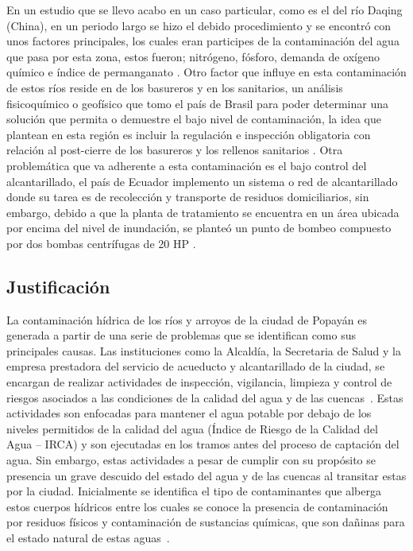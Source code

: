 En un estudio que se llevo acabo en un caso particular, como es el del río Daqing (China), en un periodo largo se hizo el debido procedimiento y se encontró con unos factores principales, los cuales eran participes de la contaminación del agua que pasa por esta zona, estos fueron; nitrógeno, fósforo, demanda de oxígeno químico e índice de permanganato \cite{He2021}. Otro factor que influye en esta contaminación de estos ríos reside en de los basureros y en los sanitarios, un análisis fisicoquímico o geofísico que tomo el país de Brasil para poder determinar una solución que permita o demuestre el bajo nivel de contaminación, la idea que plantean en esta región es incluir la regulación e inspección obligatoria con relación al post-cierre de los basureros y los rellenos sanitarios \cite{Morita2021}. Otra problemática que va adherente a esta contaminación es el bajo control del alcantarillado, el país de Ecuador implemento un sistema o red de alcantarillado donde su tarea es de recolección y transporte de residuos domiciliarios, sin embargo, debido a que la planta de tratamiento se encuentra en un área ubicada por encima del nivel de inundación, se planteó un punto de bombeo compuesto por dos bombas centrífugas de 20 HP \cite{MERCHAN2021}.
\subsection{Justificación}
La contaminación hídrica de los ríos y arroyos de la ciudad de Popayán es generada a partir de una serie de problemas que se identifican como sus principales causas. Las instituciones como la Alcaldía, la Secretaria de Salud y la empresa prestadora del servicio de acueducto y alcantarillado de la ciudad, se encargan de realizar actividades de inspección, vigilancia, limpieza y control de riesgos asociados a las condiciones de la calidad del agua y de las cuencas~\cite{SecretariadeSalud2019}. Estas actividades son enfocadas para mantener el agua potable por debajo de los niveles permitidos de la calidad del agua (Índice de Riesgo de la Calidad del Agua -- IRCA) y son ejecutadas en los tramos antes del proceso de captación del agua. Sin embargo, estas actividades a pesar de cumplir con su propósito se presencia un grave descuido del estado del agua y de las cuencas al transitar estas por la ciudad. Inicialmente se identifica el tipo de contaminantes que alberga estos cuerpos hídricos entre los cuales se conoce la presencia de contaminación por residuos físicos y contaminación de sustancias químicas, que son dañinas para el estado natural de estas aguas~\cite{tipocontaminacion}.
